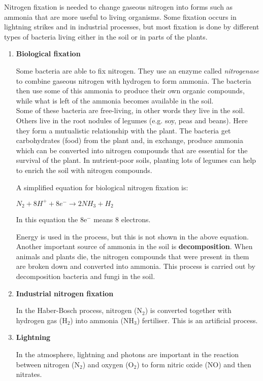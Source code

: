 Nitrogen fixation is needed to change gaseous nitrogen into forms such as ammonia that are more useful to living organisms. Some fixation occurs in lightning strikes and in industrial processes, but most fixation is done by different types of bacteria living either in the soil or in parts of the plants. 

\begin{enumerate}
\item{\textbf{Biological fixation}

Some bacteria are able to fix nitrogen. They use an enzyme called \textit{nitrogenase} to combine gaseous nitrogen with hydrogen to form ammonia. The bacteria then use some of this ammonia to produce their own organic compounds, while what is left of the ammonia becomes available in the soil. \\

Some of these bacteria are free-living, in other words they live in the soil. Others live in the root nodules of legumes (e.g. soy, peas and beans). Here they form a mutualistic relationship with the plant. The bacteria get carbohydrates (food) from the plant and, in exchange, produce ammonia which can be converted into nitrogen compounds that are essential for the survival of the plant. In nutrient-poor soils, planting lots of legumes can help to enrich the soil with nitrogen compounds.

A simplified equation for biological nitrogen fixation is:
\begin{center}
\rm${N_{2} + 8H^{+} + 8e^{-} \rightarrow 2NH_{3} + H_{2}}$
\end{center}

In this equation the 8e$^{-}$ means 8 electrons.

Energy is used in the process, but this is not shown in the above equation.\\

Another important source of ammonia in the soil is \textbf{decomposition}. When animals and plants die, the nitrogen compounds that were present in them are broken down and converted into ammonia. This process is carried out by decomposition bacteria and fungi in the soil.
}

\item{\textbf{Industrial nitrogen fixation}

In the Haber-Bosch process, nitrogen (N$_{2}$) is converted together with hydrogen gas (H$_{2}$) into ammonia (NH$_{3}$) fertiliser. This is an artificial process.}
 
\item{\textbf{Lightning}

In the atmosphere, lightning and photons are important in the reaction between nitrogen (N$_{2}$) and oxygen (O$_{2}$) to form nitric oxide (NO) and then nitrates.}

\end{enumerate}

